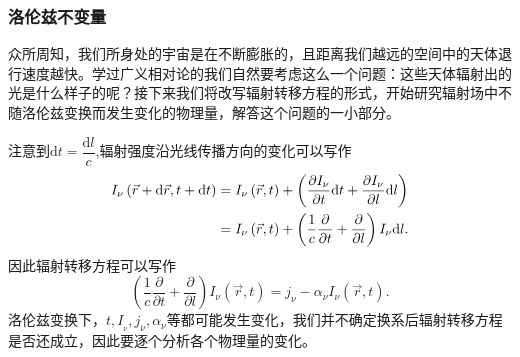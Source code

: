 \documentclass[../天体物理基础.tex]{subfiles}
\begin{document}
\subsubsection{洛伦兹不变量}
众所周知，我们所身处的宇宙是在不断膨胀的，且距离我们越远的空间中的天体退行速度越快。学过广义相对论的我们自然要考虑这么一个问题：这些天体辐射出的光是什么样子的呢？接下来我们将改写辐射转移方程的形式，开始研究辐射场中不随洛伦兹变换而发生变化的物理量，解答这个问题的一小部分。

注意到$\mathrm{d}t=\dfrac{\mathrm{d}l}c$,辐射强度沿光线传播方向的变化可以写作
\begin{align}
I_{\nu}\left(\vec{r}+\mathrm{d}\vec{r},t+\mathrm{d}t\right)&=I_\nu\left(\vec r,t\right)+\left(\frac{\partial I_\nu}{\partial t}\mathrm{d}t+\frac{\partial I_\nu}{\partial l}\mathrm{d}l\right)\notag\\
&=I_\nu\left(\vec r,t\right)+\left(\frac1c\frac{\partial}{\partial t}+\frac{\partial}{\partial l}\right)I_\nu \mathrm{d}l.
\end{align}
因此辐射转移方程可以写作
\begin{equation}
\left(\frac{1}{c}\frac{\partial}{\partial t}+\frac{\partial}{\partial l}\right)I_\nu\left(\vec r,t\right)=j_\nu-\alpha_\nu I_\nu\left(\vec{r},t\right).\label{1.1.51}
\end{equation}
洛伦兹变换下，$t,I_{_{\nu}},j_{\nu},\alpha_{\nu}$等都可能发生变化，我们并不确定换系后辐射转移方程是否还成立，因此要逐个分析各个物理量的变化。
\end{document}
